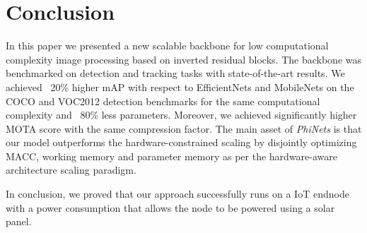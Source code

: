 \section{Conclusion}

In this paper we presented a new scalable backbone for low computational complexity image processing based on inverted residual blocks. The backbone was benchmarked on detection and tracking tasks with state-of-the-art results. We achieved ~20\% higher mAP with respect to EfficientNets and MobileNets on the COCO and VOC2012 detection benchmarks for the same computational complexity and ~80\% less parameters. Moreover, we achieved significantly higher MOTA score with the same compression factor.
The main asset of \textit{PhiNets} is that our model outperforms the hardware-constrained scaling by disjointly optimizing MACC, working memory and parameter memory as per the hardware-aware architecture scaling paradigm.

In conclusion, we proved that our approach successfully runs on a IoT endnode with a power consumption that allows the node to be powered using a solar panel.